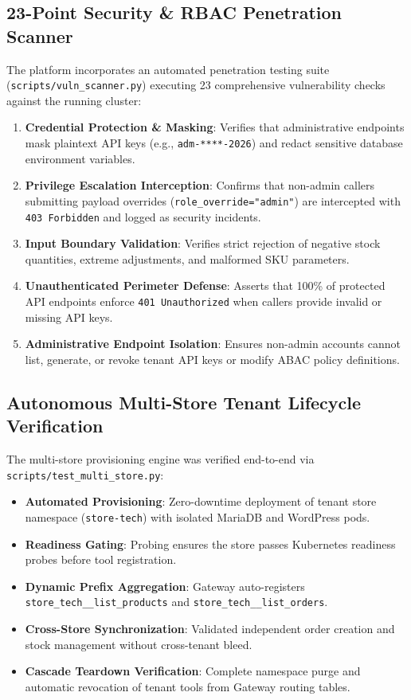 \documentclass[11pt,a4paper]{article}
\begin{document}
\subsection{23-Point Security \& RBAC Penetration Scanner}
The platform incorporates an automated penetration testing suite (\texttt{scripts/vuln\_scanner.py}) executing 23 comprehensive vulnerability checks against the running cluster:
\begin{enumerate}[leftmargin=*]
    \item \textbf{Credential Protection \& Masking}: Verifies that administrative endpoints mask plaintext API keys (e.g., \texttt{adm-****-2026}) and redact sensitive database environment variables.
    \item \textbf{Privilege Escalation Interception}: Confirms that non-admin callers submitting payload overrides (\texttt{role\_override="admin"}) are intercepted with \texttt{403 Forbidden} and logged as security incidents.
    \item \textbf{Input Boundary Validation}: Verifies strict rejection of negative stock quantities, extreme adjustments, and malformed SKU parameters.
    \item \textbf{Unauthenticated Perimeter Defense}: Asserts that 100\% of protected API endpoints enforce \texttt{401 Unauthorized} when callers provide invalid or missing API keys.
    \item \textbf{Administrative Endpoint Isolation}: Ensures non-admin accounts cannot list, generate, or revoke tenant API keys or modify ABAC policy definitions.
\end{enumerate}

\subsection{Autonomous Multi-Store Tenant Lifecycle Verification}
The multi-store provisioning engine was verified end-to-end via \texttt{scripts/test\_multi\_store.py}:
\begin{itemize}[leftmargin=*]
    \item \textbf{Automated Provisioning}: Zero-downtime deployment of tenant store namespace (\texttt{store-tech}) with isolated MariaDB and WordPress pods.
    \item \textbf{Readiness Gating}: Probing ensures the store passes Kubernetes readiness probes before tool registration.
    \item \textbf{Dynamic Prefix Aggregation}: Gateway auto-registers \texttt{store\_tech\_\_list\_products} and \texttt{store\_tech\_\_list\_orders}.
    \item \textbf{Cross-Store Synchronization}: Validated independent order creation and stock management without cross-tenant bleed.
    \item \textbf{Cascade Teardown Verification}: Complete namespace purge and automatic revocation of tenant tools from Gateway routing tables.
\end{itemize}
\end{document}
